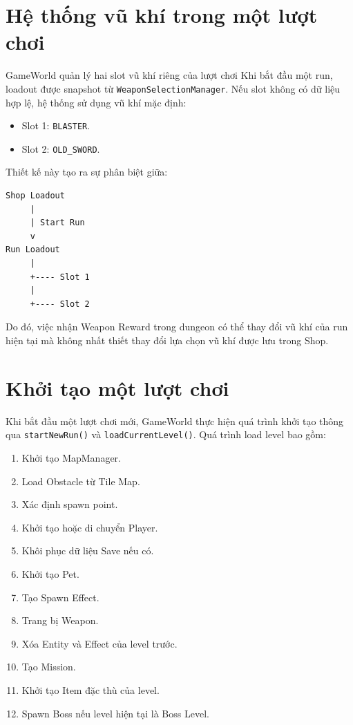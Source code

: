 \documentclass[12pt,a4paper]{report}
\begin{document}
    \section{Hệ thống vũ khí trong một lượt chơi}
    GameWorld quản lý hai slot vũ khí riêng của lượt chơi
    Khi bắt đầu một run, loadout được snapshot từ
    \texttt{WeaponSelectionManager}.
    Nếu slot không có dữ liệu hợp lệ, hệ thống sử dụng vũ khí mặc
    định:
    \begin{itemize}
        \item Slot 1: \texttt{BLASTER}.
        \item Slot 2: \texttt{OLD\_SWORD}.
    \end{itemize}
    Thiết kế này tạo ra sự phân biệt giữa:
    \begin{verbatim}
Shop Loadout
     |
     | Start Run
     v
Run Loadout
     |
     +---- Slot 1
     |
     +---- Slot 2
    \end{verbatim}
    Do đó, việc nhận Weapon Reward trong dungeon có thể thay đổi
    vũ khí của run hiện tại mà không nhất thiết thay đổi lựa chọn
    vũ khí được lưu trong Shop.


    \section{Khởi tạo một lượt chơi}
    Khi bắt đầu một lượt chơi mới, GameWorld thực hiện quá trình
    khởi tạo thông qua \texttt{startNewRun()} và
    \texttt{loadCurrentLevel()}.
    Quá trình load level bao gồm:
    \begin{enumerate}
        \item Khởi tạo MapManager.
        \item Load Obstacle từ Tile Map.
        \item Xác định spawn point.
        \item Khởi tạo hoặc di chuyển Player.
        \item Khôi phục dữ liệu Save nếu có.
        \item Khởi tạo Pet.
        \item Tạo Spawn Effect.
        \item Trang bị Weapon.
        \item Xóa Entity và Effect của level trước.
        \item Tạo Mission.
        \item Khởi tạo Item đặc thù của level.
        \item Spawn Boss nếu level hiện tại là Boss Level.
    \end{enumerate}
\end{document}
